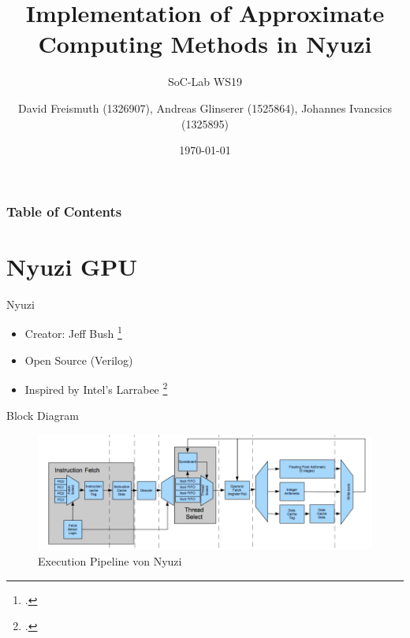 \documentclass{beamer}
\title[Implementation of Approximate Computing Methods in Nyuzi] %
{Implementation of Approximate Computing Methods in Nyuzi}
\subtitle{SoC-Lab WS19}
\author[David Freismuth (1326907), Andreas Glinserer (1525864), \\
Johannes Ivancsics (1325895)] %
{David Freismuth (1326907), Andreas Glinserer (1525864), Johannes Ivancsics (1325895)}
\date[\today] %
{\today}
\begin{document}
\frame{\titlepage}


\begin{frame}
\frametitle{Table of Contents}
\tableofcontents
\end{frame}

\section{Nyuzi GPU}
\begin{frame}{Nyuzi}
    \begin{itemize}
        \item<1-> Creator: Jeff Bush \footcite{Nyuzi}
        \item<2-> Open Source (Verilog)
        \item<3-> Inspired by Intel's Larrabee \footcite{Seiler:2008:LMX:1360612.1360617}
    \end{itemize}
\end{frame}
\begin{frame}{Block Diagram}
    \begin{figure}
        \includegraphics[width=\linewidth]{nyuzi-execute-pipeline}
        \caption{Execution Pipeline von Nyuzi}
    \end{figure}
\end{frame}
\end{document}
